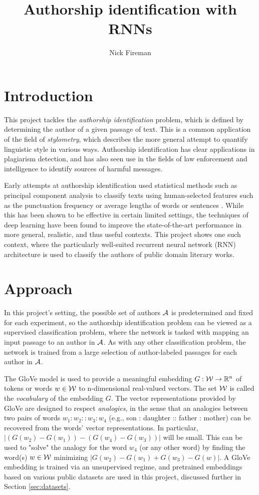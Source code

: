 \documentclass[12pt,letterpaper]{article}
\title{Authorship identification with RNNs}
\author{Nick Fireman}
\date{}
\begin{document}
\maketitle

\section{Introduction}

This project tackles the \emph{authorship identification} problem, which is defined by determining the author of a given passage of text. This is a common application of the field of \emph{stylometry}, which describes the more general attempt to quantify linguistic style in various ways. Authorship identification has clear applications in plagiarism detection, and has also seen use in the fields of law enforcement and intelligence to identify sources of harmful messages.

Early attempts at authorship identification used statistical methods such as principal component analysis to classify texts using human-selected features such as the punctuation frequency or average lengths of words or sentences \cite{binongo1999}. While this has been shown to be effective in certain limited settings, the techniques of deep learning have been found to improve the state-of-the-art performance in more general, realistic, and thus useful contexts. This project shows one such context, where the particularly well-suited recurrent neural network (RNN) architecture is used to classify the authors of public domain literary works.

\section{Approach}

In this project's setting, the possible set of authors $\mathcal{A}$ is predetermined and fixed for each experiment, so the authorship identification problem can be viewed as a supervised classification problem, where the network is tasked with mapping an input passage to an author in $\mathcal{A}$. As with any other classification problem, the network is trained from a large selection of author-labeled passages for each author in $\mathcal{A}$. 

The GloVe model \cite{pennington2014GloVe}  is used to provide a meaningful embedding $G: \mathcal{W} \rightarrow \mathbb{R}^n$ of tokens or words $w \in \mathcal{W}$ to n-dimensional real-valued vectors. The set $\mathcal{W}$ is called the \emph{vocabulary} of the embedding $G$. The vector representations provided by GloVe are designed to respect \emph{analogies}, in the sense that an analogies between two pairs of words $w_1:w_2::w_3:w_4$ (e.g., son : daughter :: father : mother) can be recovered from the words' vector representations. In particular, $|(G(w_2)-G(w_1)) - (G(w_4) - G(w_3))|$ will be small. This can be used to "solve" the analogy for the word $w_4$ (or any other word) by finding the word(s) $w \in \mathcal{W}$ minimizing $|G(w_2)-G(w_1) + G(w_3) - G(w)|$. A GloVe embedding is trained via an unsupervised regime, and pretrained embeddings based on various public datasets are used in this project, discussed further in Section \ref{sec:datasets}. 
\end{document}
